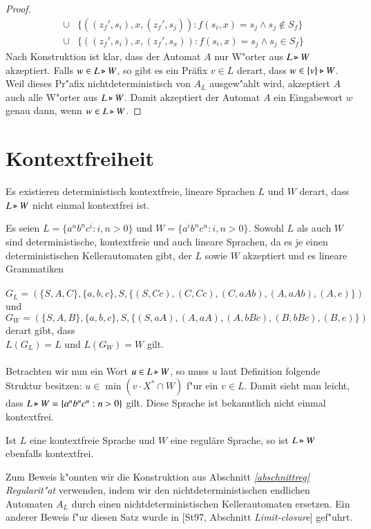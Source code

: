\begin{proof}
\begin{eqnarray}
 & \cup & \{ ((z_f',s_i),x,(z_f',s_j)) : f(s_i,x)=s_j  \wedge s_j \notin S_f\} \label{auto3}\\
 & \cup & \{ ((z_f',s_i),x,(z_f',s_x)) : f(s_i,x)=s_j  \wedge s_j \in S_f \label{auto4} \}
\end{eqnarray}
Nach Konstruktion ist klar, dass der Automat $A$ nur W"orter aus $L\triangleright W$ akzeptiert. Falls $w\in L\triangleright W$, so gibt es ein Präfix $v\in L$ derart, dass $w\in \{v\}\triangleright W$. Weil dieses Pr"afix nichtdeterministisch von $A_L$ ausgew"ahlt wird, akzeptiert $A$ auch alle W"orter aus $L\triangleright W$.
Damit akzeptiert der Automat $A$ ein Eingabewort $w$ genau dann, wenn $w\in L\triangleright W$.
\end{proof}

\section{Kontextfreiheit}
Es existieren deterministisch kontextfreie, lineare Sprachen $L$ und $W$ derart, dass $L\triangleright W$ nicht einmal kontextfrei ist.

\vspace{2ex}

\begin{beispiel}
Es seien $L=\{a^nb^nc^i:i,n>0\}$ und $W=\{a^ib^nc^n:i,n>0\}$. Sowohl $L$ als auch $W$ sind deterministische, kontextfreie und auch lineare Sprachen, da es je einen deterministischen Kellerautomaten gibt, der $L$ sowie $W$ akzeptiert und es lineare Grammatiken \\\\$G_L = (\{S,A,C\},\{a,b,c\},S,\{ (S,Cc),(C,Cc),(C,aAb),(A,aAb),(A,e)\})$ und \\$G_W = (\{S,A,B\},\{a,b,c\},S,\{ (S,aA),(A,aA),(A,bBc),(B,bBc),(B,e) \})$ derart gibt, dass \\$L(G_L) = L$ und $L(G_W) = W$ gilt.\\\\
Betrachten wir nun ein Wort $u\in L\triangleright W$, so muss $u$ laut Definition folgende Struktur besitzen: $u\in \min( v\cdot X^* \cap W)$ f"ur ein $v \in L$.
Damit sieht man leicht, dass $L\triangleright W= \{a^nb^nc^n:n>0\}$ gilt. Diese Sprache ist bekanntlich nicht einmal kontextfrei.
\end{beispiel}

\vspace{2ex}

\begin{satz}
Ist $L$ eine kontextfreie Sprache und $W$ eine reguläre Sprache, so ist $L\triangleright W$ ebenfalls kontextfrei.
\end{satz}
Zum Beweis k"onnten wir die Konstruktion aus Abschnitt \emph{\ref{abschnittreg} Regularit"at} verwenden, indem wir den nichtdeterministischen endlichen Automaten $A_L$ durch einen nichtdeterministischen Kellerautomaten ersetzen.
Ein anderer Beweis f"ur diesen Satz wurde in [St97, Abschnitt \emph{Limit-closure}] gef"uhrt.
\newpage
